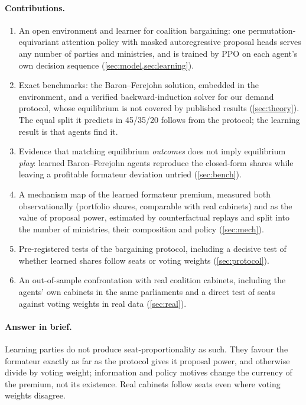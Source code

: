 \documentclass[11pt,a4paper]{article}
\begin{document}
\paragraph{Contributions.}
\begin{enumerate}
\item An open environment and learner for coalition bargaining: one permutation-equivariant attention
policy with masked autoregressive proposal heads serves any number of parties and ministries, and is
trained by PPO on each agent's own decision sequence (\cref{sec:model,sec:learning}).
\item Exact benchmarks: the Baron--Ferejohn solution, embedded in the environment, and a verified
backward-induction solver for our demand protocol, whose equilibrium is not covered by published results
(\cref{sec:theory}). The equal split it predicts in 45/35/20 follows from the protocol; the learning
result is that agents find it.
\item Evidence that matching equilibrium \emph{outcomes} does not imply equilibrium \emph{play}: learned
Baron--Ferejohn agents reproduce the closed-form shares while leaving a profitable formateur deviation
untried (\cref{sec:bench}).
\item A mechanism map of the learned formateur premium, measured both observationally (portfolio shares,
comparable with real cabinets) and as the value of proposal power, estimated by counterfactual replays and
split into the number of ministries, their composition and policy (\cref{sec:mech}).
\item Pre-registered tests of the bargaining protocol, including a decisive test of whether learned
shares follow seats or voting weights (\cref{sec:protocol}).
\item An out-of-sample confrontation with \RealN{} real coalition cabinets, including the agents' own
cabinets in the same parliaments and a direct test of seats against voting weights in real data
(\cref{sec:real}).
\end{enumerate}

\paragraph{Answer in brief.} Learning parties do not produce seat-proportionality as such. They favour
the formateur exactly as far as the protocol gives it proposal power, and otherwise divide by voting
weight; information and policy motives change the currency of the premium, not its existence. Real
cabinets follow seats even where voting weights disagree.
\end{document}

